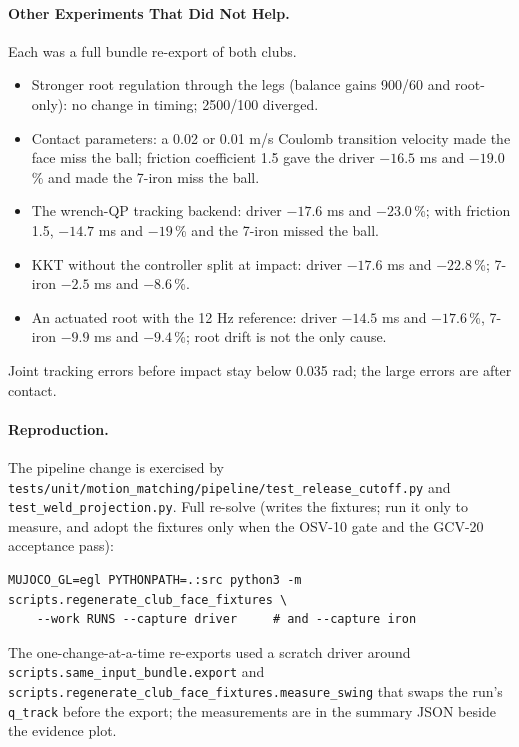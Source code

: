 \documentclass[11pt,a4paper]{article}
\begin{document}
\paragraph{Other Experiments That Did Not Help.} Each was a full bundle
re-export of both clubs.
\begin{itemize}
\item Stronger root regulation through the legs (balance gains 900/60 and
root-only): no change in timing; 2500/100 diverged.
\item Contact parameters: a 0.02 or 0.01 m/s Coulomb transition velocity made
the face miss the ball; friction coefficient 1.5 gave the driver $-16.5$ ms
and $-19.0$\,\% and made the 7-iron miss the ball.
\item The wrench-QP tracking backend: driver $-17.6$ ms and $-23.0$\,\%; with
friction 1.5, $-14.7$ ms and $-19$\,\% and the 7-iron missed the ball.
\item KKT without the controller split at impact: driver $-17.6$ ms and
$-22.8$\,\%; 7-iron $-2.5$ ms and $-8.6$\,\%.
\item An actuated root with the 12 Hz reference: driver $-14.5$ ms and
$-17.6$\,\%, 7-iron $-9.9$ ms and $-9.4$\,\%; root drift is not the only
cause.
\end{itemize}
Joint tracking errors before impact stay below 0.035 rad; the large errors
are after contact.

\paragraph{Reproduction.} The pipeline change is exercised by
\texttt{tests/unit/motion\_matching/pipeline/test\_release\_cutoff.py} and
\texttt{test\_weld\_projection.py}. Full re-solve (writes the fixtures; run
it only to measure, and adopt the fixtures only when the OSV-10 gate and the
GCV-20 acceptance pass):
\begin{verbatim}
MUJOCO_GL=egl PYTHONPATH=.:src python3 -m scripts.regenerate_club_face_fixtures \
    --work RUNS --capture driver     # and --capture iron
\end{verbatim}
The one-change-at-a-time re-exports used a scratch driver around
\texttt{scripts.same\_input\_bundle.export} and
\texttt{scripts.regenerate\_club\_face\_fixtures.measure\_swing} that swaps
the run's \texttt{q\_track} before the export; the measurements are in the
summary JSON beside the evidence plot.
\end{document}
